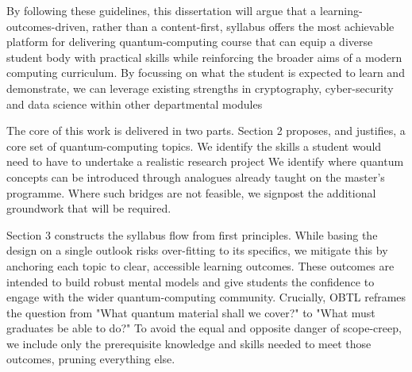 By following these guidelines, this dissertation will argue that a learning-outcomes-driven, rather than a content-first, syllabus 
offers the most achievable platform for delivering quantum-computing course 
that can equip a diverse student body with practical skills while reinforcing the broader aims of a modern computing curriculum. 
By focussing on what the student is expected to learn and demonstrate, we can leverage existing strengths 
in cryptography, cyber-security and data science within other departmental modules
 
The core of this work is delivered in two parts.  
Section 2 proposes, and justifies, a core set of quantum-computing topics.
We identify the skills a student would need to have to undertake a realistic research project 
We identify where quantum concepts can be introduced through analogues already taught on the master's programme.
Where such bridges are not feasible, we signpost the additional groundwork that will be required.


Section 3 constructs the syllabus flow from first principles. 
While basing the design on a single outlook risks over-fitting to its specifics, 
we mitigate this by anchoring each topic to clear, accessible learning outcomes.
These outcomes are intended to build robust mental models and give students the confidence to engage with the wider quantum-computing community. 
Crucially, OBTL reframes the question from "What quantum material shall we cover?" to "What must graduates be able to do?"
To avoid the equal and opposite danger of scope-creep, we include only the prerequisite knowledge and skills needed to meet those outcomes, pruning everything else.

